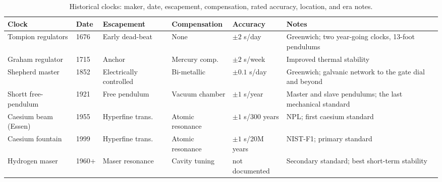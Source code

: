 \begin{table}
  \centering
  \caption{Historical clocks: maker, date, escapement, compensation, rated accuracy, location, and era notes.}
  \label{tab:clocks}
  \begin{tabularx}{\linewidth}{llXXlX}
    \toprule
    \textbf{Clock} & \textbf{Date} & \textbf{Escapement} & \textbf{Compensation} & \textbf{Accuracy} & \textbf{Notes} \\
    \midrule
    Tompion regulators & 1676 & Early dead-beat & None & $\pm 2$ s/day & Greenwich; two year-going clocks, 13-foot pendulums \\
    Graham regulator & 1715 & Anchor & Mercury comp. & $\pm 2$ s/week & Improved thermal stability \\
    Shepherd master & 1852 & Electrically controlled & Bi-metallic & $\pm 0.1$ s/day & Greenwich; galvanic network to the gate dial and beyond \\
    Shortt free-pendulum & 1921 & Free pendulum & Vacuum chamber & $\pm 1$ s/year & Master and slave pendulums; the last mechanical standard \\
    Caesium beam (Essen) & 1955 & Hyperfine trans. & Atomic resonance & $\pm 1$ s/300 years & NPL; first caesium standard \\
    Caesium fountain & 1999 & Hyperfine trans. & Atomic resonance & $\pm 1$ s/20M years & NIST-F1; primary standard \\
    Hydrogen maser & 1960+ & Maser resonance & Cavity tuning & not documented & Secondary standard; best short-term stability \\
    \bottomrule
  \end{tabularx}
\end{table}

